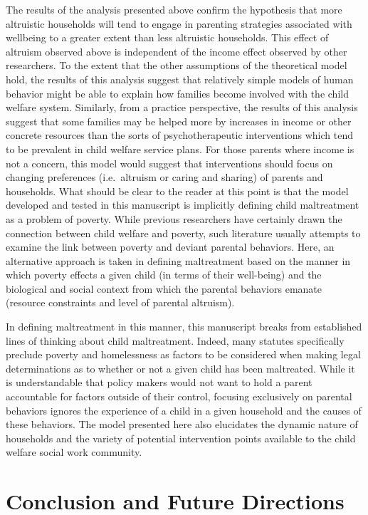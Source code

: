 \documentclass[]{elsarticle}
\begin{document}
The results of the analysis presented above confirm the hypothesis that
more altruistic households will tend to engage in parenting strategies
associated with wellbeing to a greater extent than less altruistic
households. This effect of altruism observed above is independent of the
income effect observed by other researchers. To the extent that the
other assumptions of the theoretical model hold, the results of this
analysis suggest that relatively simple models of human behavior might
be able to explain how families become involved with the child welfare
system. Similarly, from a practice perspective, the results of this
analysis suggest that some families may be helped more by increases in
income or other concrete resources than the sorts of psychotherapeutic
interventions which tend to be prevalent in child welfare service plans.
For those parents where income is not a concern, this model would
suggest that interventions should focus on changing preferences
(i.e.~altruism or caring and sharing) of parents and households. What
should be clear to the reader at this point is that the model developed
and tested in this manuscript is implicitly defining child maltreatment
as a problem of poverty. While previous researchers have certainly drawn
the connection between child welfare and poverty, such literature
usually attempts to examine the link between poverty and deviant
parental behaviors. Here, an alternative approach is taken in defining
maltreatment based on the manner in which poverty effects a given child
(in terms of their well-being) and the biological and social context
from which the parental behaviors emanate (resource constraints and
level of parental altruism).

In defining maltreatment in this manner, this manuscript breaks from
established lines of thinking about child maltreatment. Indeed, many
statutes specifically preclude poverty and homelessness as factors to be
considered when making legal determinations as to whether or not a given
child has been maltreated. While it is understandable that policy makers
would not want to hold a parent accountable for factors outside of their
control, focusing exclusively on parental behaviors ignores the
experience of a child in a given household and the causes of these
behaviors. The model presented here also elucidates the dynamic nature
of households and the variety of potential intervention points available
to the child welfare social work community.

\section{Conclusion and Future
Directions}\label{conclusion-and-future-directions}
\end{document}
